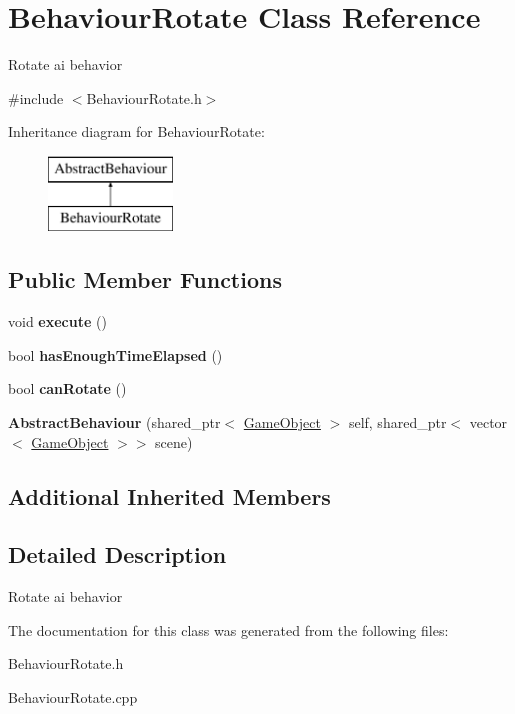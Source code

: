 \hypertarget{class_behaviour_rotate}{}\section{Behaviour\+Rotate Class Reference}
\label{class_behaviour_rotate}


Rotate ai behavior  




{\ttfamily \#include $<$Behaviour\+Rotate.\+h$>$}

Inheritance diagram for Behaviour\+Rotate\+:\begin{figure}[H]
\begin{center}
\leavevmode
\includegraphics[height=2.000000cm]{class_behaviour_rotate}
\end{center}
\end{figure}
\subsection*{Public Member Functions}
\begin{DoxyCompactItemize}
\item 
\mbox{\label{class_behaviour_rotate_aa01153f4a487813580ecb5d5145da47c}} 
void {\bfseries execute} ()
\item 
\mbox{\label{class_behaviour_rotate_a35e30578ca4a2a7fd96e01573e5791fd}} 
bool {\bfseries has\+Enough\+Time\+Elapsed} ()
\item 
\mbox{\label{class_behaviour_rotate_a93f1ef9eb3fe2ea8dfb49a4e435b48a5}} 
bool {\bfseries can\+Rotate} ()
\item 
\mbox{\label{class_behaviour_rotate_a8a3a9217b3179f949a1d6a32f340c00c}} 
{\bfseries Abstract\+Behaviour} (shared\+\_\+ptr$<$ \mbox{\hyperlink{class_game_object}{Game\+Object}} $>$ self, shared\+\_\+ptr$<$ vector$<$ \mbox{\hyperlink{class_game_object}{Game\+Object}} $>$$>$ scene)
\end{DoxyCompactItemize}
\subsection*{Additional Inherited Members}


\subsection{Detailed Description}
Rotate ai behavior 



The documentation for this class was generated from the following files\+:\begin{DoxyCompactItemize}
\item 
Behaviour\+Rotate.\+h\item 
Behaviour\+Rotate.\+cpp\end{DoxyCompactItemize}
